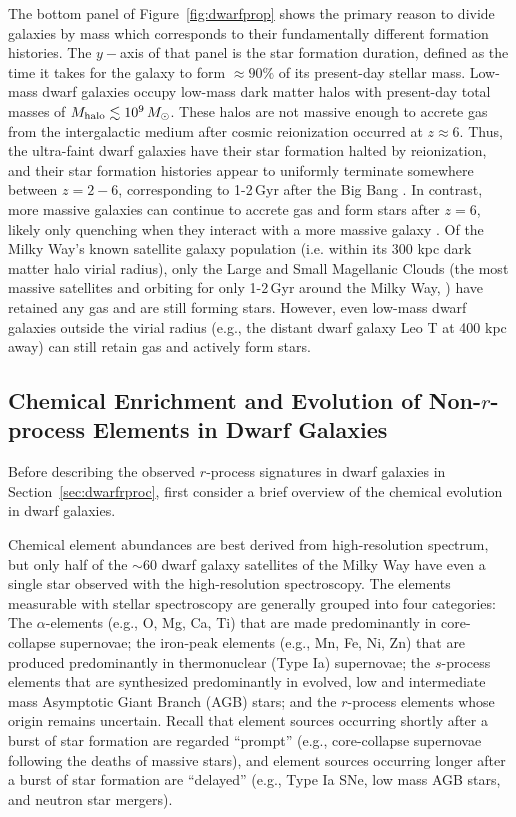 \documentclass[letterpaper]{article}
\begin{document}
The bottom panel of Figure~\ref{fig:dwarfprop} shows the primary reason to divide galaxies by mass which corresponds to their fundamentally different formation histories.
The $y-$axis of that panel is the star formation duration, defined as the time it takes for the galaxy to form ${\approx}90\%$ of its present-day stellar mass.
Low-mass dwarf galaxies occupy low-mass dark matter halos with present-day total masses of $M_{\rm halo} \lesssim 10^9\,M_\odot$. These halos are not massive enough to accrete gas from the intergalactic medium after cosmic reionization occurred at $z \approx 6$. Thus, the ultra-faint dwarf galaxies have their star formation halted by reionization, and their star formation histories appear to uniformly terminate somewhere between $z=2-6$, corresponding to 1-2\,Gyr after the Big Bang \citep{Weisz2014,Brown2014, RodriguezWimberly2019}.
In contrast, more massive galaxies can continue to accrete gas and form stars after $z=6$, likely only quenching when they interact with a more massive galaxy \citep{Geha2012,Fillingham2019}. Of the Milky Way's known satellite galaxy population (i.e. within its 300 kpc dark matter halo virial radius), only the Large and Small Magellanic Clouds (the most massive satellites and orbiting for only 1-2\,Gyr around the Milky Way, \citealt{Besla2007, Kallivayalil2013}) have retained any gas and are still forming stars.
However, even low-mass dwarf galaxies outside the virial radius (e.g., the distant dwarf galaxy Leo T at 400 kpc away) can still retain gas and actively form stars.



\subsection{Chemical Enrichment and Evolution of Non-$r$-process Elements in Dwarf Galaxies}

Before describing the observed $r$-process signatures in dwarf galaxies in Section~\ref{sec:dwarfrproc}, first consider a brief overview of the chemical evolution in dwarf galaxies.

Chemical element abundances are best derived from high-resolution spectrum, but only half of the ${\sim}60$ dwarf galaxy satellites of the Milky Way have even a single star observed with the high-resolution spectroscopy. 
The elements measurable with stellar spectroscopy are generally grouped into four categories: The $\alpha$-elements (e.g., O, Mg, Ca, Ti) that are made predominantly in core-collapse supernovae; the iron-peak elements (e.g., Mn, Fe, Ni, Zn) that are produced predominantly in thermonuclear (Type Ia) supernovae; the $s$-process elements that are synthesized predominantly in evolved, low and intermediate mass Asymptotic Giant Branch (AGB) stars; and the $r$-process elements whose origin remains uncertain.
Recall that element sources occurring shortly after a burst of star formation are regarded ``prompt'' (e.g., core-collapse supernovae following the deaths of massive stars), and element sources occurring longer after a burst of star formation are ``delayed'' (e.g., Type Ia SNe, low mass AGB stars, and neutron star mergers). 
\end{document}
